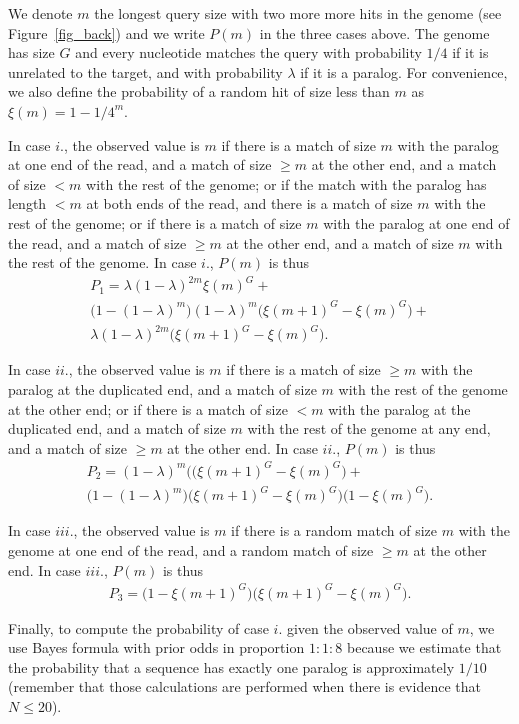 \documentclass[a4,center,fleqn]{NAR}
\begin{document}
We denote $m$ the longest query size with two more more hits in the genome
(see Figure~\ref{fig_back}) and we write $P(m)$ in the three cases above.
The genome has size $G$ and every nucleotide matches the query with
probability $1/4$ if it is unrelated to the target, and with probability
$\lambda$ if it is a paralog. For convenience, we also define the
probability of a random hit of size less than $m$ as $\xi(m) = 1-1/4^m$.

In case $i.$, the observed value is $m$ if there is a match of size $m$
with the paralog at one end of the read, and a match of size $\geq m$ at
the other end, and a match of size $< m$ with the rest of the genome;
or if the match with the paralog has length $< m$ at both ends of the
read, and there is a match of size $m$ with the rest of the genome; or if
there is a match of size $m$ with the paralog at one end of the read, and
a match of size $\geq m$ at the other end, and a match of size $m$ with
the rest of the genome. In case $i.$, $P(m)$ is thus
\begin{align*}
P_1 = \lambda (1-\lambda)^{2m} \xi(m)^G + \\
\big(1-(1-\lambda)^m\big)(1-\lambda)^m \big(\xi(m+1)^G - \xi(m)^G\big) + \\
\lambda (1-\lambda)^{2m} \big(\xi(m+1)^G - \xi(m)^G\big).
\end{align*}

In case $ii.$, the observed value is $m$ if there is a match of size $\geq
m$ with the paralog at the duplicated end, and a match of size $m$ with
the rest of the genome at the other end; or if there is a match of size $<
m$ with the paralog at the duplicated end, and a match of size $m$ with
the rest of the genome at any end, and a match of size $\geq m$ at the
other end. In case $ii.$, $P(m)$ is thus
\begin{align*}
P_2 = (1-\lambda)^m \big((\xi(m+1)^G - \xi(m)^G\big) + \\
\big(1-(1-\lambda)^m\big) \big(\xi(m+1)^G - \xi(m)^G\big)
\big(1 - \xi(m)^G\big).
\end{align*}

In case $iii.$, the observed value is $m$ if there is a random match of
size $m$ with the genome at one end of the read, and a random match of
size $\geq m$ at the other end. In case $iii.$, $P(m)$ is thus
\begin{align*}
P_3 = \big(1-\xi(m+1)^G\big) \big(\xi(m+1)^G - \xi(m)^G\big).
\end{align*}

Finally, to compute the probability of case $i.$ given the observed value
of $m$, we use Bayes formula with prior odds in proportion $1:1:8$ because
we estimate that the probability that a sequence has exactly one paralog
is approximately $1/10$ (remember that those calculations are performed
when there is evidence that $N \leq 20$).
\end{document}
